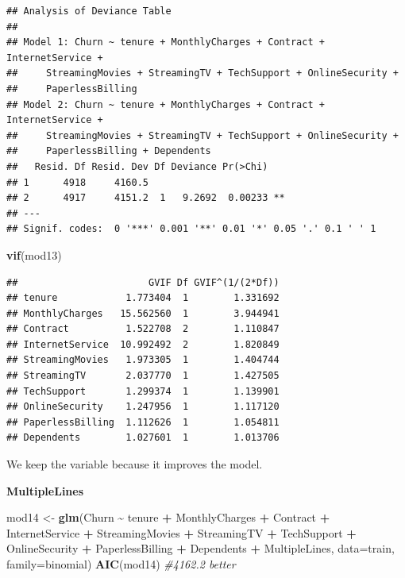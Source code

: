 \documentclass[
  twoside]{article}
\newenvironment{Shaded}{\begin{snugshade}}{\end{snugshade}}
\newcommand{\AttributeTok}[1]{\textcolor[rgb]{0.13,0.29,0.53}{#1}}
\newcommand{\CommentTok}[1]{\textcolor[rgb]{0.56,0.35,0.01}{\textit{#1}}}
\newcommand{\FunctionTok}[1]{\textcolor[rgb]{0.13,0.29,0.53}{\textbf{#1}}}
\newcommand{\NormalTok}[1]{#1}
\newcommand{\OtherTok}[1]{\textcolor[rgb]{0.56,0.35,0.01}{#1}}
\newcommand{\SpecialCharTok}[1]{\textcolor[rgb]{0.81,0.36,0.00}{\textbf{#1}}}
\begin{document}
\begin{verbatim}
## Analysis of Deviance Table
## 
## Model 1: Churn ~ tenure + MonthlyCharges + Contract + InternetService + 
##     StreamingMovies + StreamingTV + TechSupport + OnlineSecurity + 
##     PaperlessBilling
## Model 2: Churn ~ tenure + MonthlyCharges + Contract + InternetService + 
##     StreamingMovies + StreamingTV + TechSupport + OnlineSecurity + 
##     PaperlessBilling + Dependents
##   Resid. Df Resid. Dev Df Deviance Pr(>Chi)   
## 1      4918     4160.5                        
## 2      4917     4151.2  1   9.2692  0.00233 **
## ---
## Signif. codes:  0 '***' 0.001 '**' 0.01 '*' 0.05 '.' 0.1 ' ' 1
\end{verbatim}

\begin{Shaded}
\begin{Highlighting}[]
\FunctionTok{vif}\NormalTok{(mod13)}
\end{Highlighting}
\end{Shaded}

\begin{verbatim}
##                       GVIF Df GVIF^(1/(2*Df))
## tenure            1.773404  1        1.331692
## MonthlyCharges   15.562560  1        3.944941
## Contract          1.522708  2        1.110847
## InternetService  10.992492  2        1.820849
## StreamingMovies   1.973305  1        1.404744
## StreamingTV       2.037770  1        1.427505
## TechSupport       1.299374  1        1.139901
## OnlineSecurity    1.247956  1        1.117120
## PaperlessBilling  1.112626  1        1.054811
## Dependents        1.027601  1        1.013706
\end{verbatim}

We keep the variable because it improves the model.

\textbf{MultipleLines}

\begin{Shaded}
\begin{Highlighting}[]
\NormalTok{mod14 }\OtherTok{\textless{}{-}} \FunctionTok{glm}\NormalTok{(Churn }\SpecialCharTok{\textasciitilde{}}\NormalTok{ tenure }\SpecialCharTok{+}\NormalTok{ MonthlyCharges }\SpecialCharTok{+}\NormalTok{ Contract }\SpecialCharTok{+}\NormalTok{ InternetService }\SpecialCharTok{+} 
\NormalTok{               StreamingMovies }\SpecialCharTok{+}\NormalTok{ StreamingTV }\SpecialCharTok{+}\NormalTok{ TechSupport }\SpecialCharTok{+}\NormalTok{ OnlineSecurity }\SpecialCharTok{+} 
\NormalTok{               PaperlessBilling }\SpecialCharTok{+}\NormalTok{ Dependents }\SpecialCharTok{+}\NormalTok{ MultipleLines,}
             \AttributeTok{data=}\NormalTok{train, }\AttributeTok{family=}\NormalTok{binomial)}
\FunctionTok{AIC}\NormalTok{(mod14) }\CommentTok{\#4162.2 better}
\end{Highlighting}
\end{Shaded}
\end{document}
